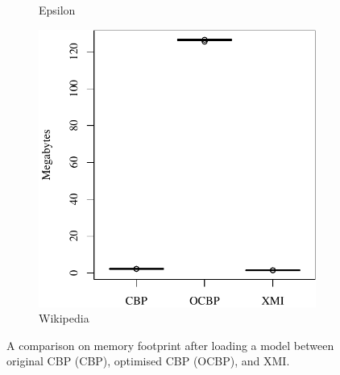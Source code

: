\documentclass{beamer}
\begin{document}
\begin{frame}[fragile]
\begin{figure}[ht]
\begin{subfigure}{0.325\textwidth}
        \caption{Epsilon}
        \label{fig:load_memory_epsilon}
    \end{subfigure}
    \hfill
    \begin{subfigure}{0.325\textwidth}
        \centering
        \includegraphics[width=\linewidth]{load_memory_wikipedia}
        \caption{Wikipedia}
        \label{fig:load_memory_wikipedia}
    \end{subfigure}
    \caption{A comparison on memory footprint after loading a model between original CBP (CBP), optimised CBP (OCBP), and XMI.}
    \label{fig:loadmemory}
\end{figure}
\end{frame}
\end{document}
